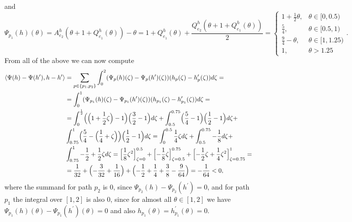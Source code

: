 \documentclass[reqno,openany]{amsbook}
\theoremstyle{definition}
\theoremstyle{plain}
\begin{document}
and 
\[\Psi_{p_1}(h)(\theta) =A_{e_2}^h(\theta + 1 + Q_{e_1}^h(\theta)) - \theta = 
1 + Q_{e_1}^h(\theta) + \frac{Q_{e_2}^h(\theta + 1 + Q_{e_1}^h(\theta))}{2} = \begin{cases} 1 + \frac{1}{2}\theta,& \theta \in [0, 0.5) \\ \frac{5}{4},& \theta \in [0.5, 1) \\ \frac{9}{4} - \theta,& \theta \in [1, 1.25) \\ 1,& \theta  > 1.25 \end{cases}. \]
From all of the above we can now compute
\begin{align}
	\begin{split}
		\langle \Psi(h) - \Psi(h^{\prime}), h - h^{\prime} \rangle &= \sum_{p \in \{p_1, p_2\}} \int_0^2 (\Psi_p(h)(\zeta) - 
		\Psi_p(h^{\prime})(\zeta))(h_p(\zeta) - h_p^{\prime}(\zeta)) d\zeta =\\
		&= \int_0^1 (\Psi_{p_1}(h)(\zeta) - \Psi_{p_1}(h^{\prime})(\zeta))(h_{p_1}(\zeta) - h_{p_1}^{\prime}(\zeta)) d\zeta =\\
		&= \int_0^{\frac{1}{2}} \Bigl(\Bigl(1 + \frac{1}{2}\zeta\Bigr) - 1\Bigr)\Bigl(\frac{3}{2} - 1\Bigr) d\zeta + 
		\int_{0.5}^{0.75} \Bigl(\frac{5}{4} - 1\Bigr)\Bigl(\frac{1}{2} - 1\Bigr) d\zeta + \\
		&\int_{0.75}^{1} \Bigl(\frac{5}{4} - \Bigl(\frac{1}{4} + \zeta\Bigr)\Bigr)\Bigl(\frac{1}{2} - 1\Bigr) d\zeta =  
		\int_0^{0.5} \frac{1}{4}\zeta d\zeta + \int_{0.5}^{0.75} -\frac{1}{8} d\zeta + \\
		&\int_{0.75}^{1} -\frac{1}{2} + \frac{1}{2}\zeta d\zeta = \Bigl[\frac{1}{8}\zeta^2\Bigr]_{\zeta = 0}^{0.5} + 
		\Bigl[-\frac{1}{8}\zeta\Bigr]_{\zeta = 0.5}^{0.75} + 
		\Bigl[-\frac{1}{2}\zeta + \frac{1}{4}\zeta^2\Bigr]_{\zeta = 0.75}^{1} =\\
		&= \frac{1}{32} + \Bigl(-\frac{3}{32} + \frac{1}{16}\Bigr) + 
		\Bigl(-\frac{1}{2} + \frac{1}{4} + \frac{3}{8} - \frac{9}{64}\Bigr) =
		 -\frac{1}{64} < 0,
	\end{split}
\end{align}
where the summand for path $p_2$ is $0$, since $\Psi_{p_2}(h) - \Psi_{p_2}(h^{\prime}) = 0$, and for path $p_1$ the integral over $[1, 2]$ is also $0$, since for almost all $\theta \in [1, 2]$ we have $\Psi_{p_1}(h)(\theta) - \Psi_{p_1}(h^{\prime})(\theta) = 0$ and also $h_{p_1}(\theta) = h_{p_1}^{\prime}(\theta) = 0$.
\end{document}
